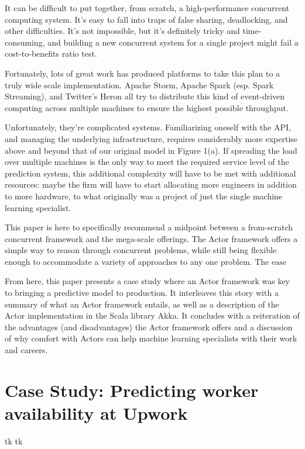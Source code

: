 \documentclass{article}
\begin{document}
It can be difficult to put together, from scratch, a high-performance concurrent computing system. It's easy to fall into traps of false sharing, deadlocking, and other difficulties. It's not impossible, but it's definitely tricky and time-consuming, and building a new concurrent system for a single project might fail a cost-to-benefits ratio test.

Fortunately, lots of great work has produced platforms to take this plan to a truly wide scale implementation. Apache Storm, Apache Spark (esp. Spark Streaming), and Twitter's Heron all try to distribute this kind of event-driven computing across multiple machines to ensure the highest possible throughput.

Unfortunately, they're complicated systems. Familiarizing oneself with the API, and managing the underlying infrastructure, requires considerably more expertise above and beyond that of our original model in Figure 1(a). If spreading the load over multiple machines is the only way to meet the required service level of the prediction system, this additional complexity will have to be met with additional resources: maybe the firm will have to start allocating more engineers in addition to more hardware, to what originally was a project of just the single machine learning specialist.

This paper is here to specifically recommend a midpoint between a from-scratch concurrent framework and the mega-scale offerings. The Actor framework offers a simple way to reason through concurrent problems, while still being flexible enough to accommodate a variety of approaches to any one problem. The ease 

From here, this paper presents a case study where an Actor framework was key to bringing a predictive model to production. It interleaves this story with a summary of what an Actor framework entails, as well as a description of the Actor implementation in the Scala library Akka. It concludes with a reiteration of the advantages (and disadvantages) the Actor framework offers and a discussion of why comfort with Actors can help machine learning specialists with their work and careers.

\section{Case Study: Predicting worker availability at Upwork}

tk tk
\end{document}
